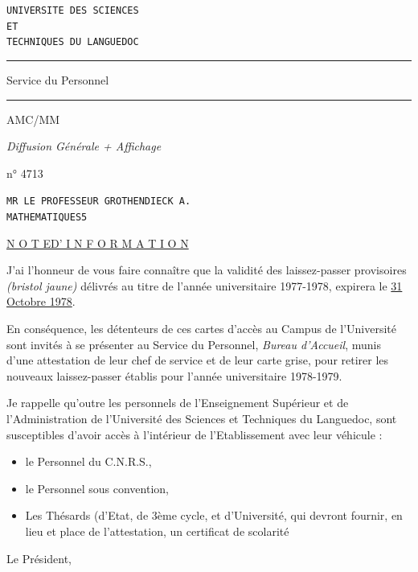 
\begin{flushleft}
\texttt{UNIVERSITE DES SCIENCES}\\
\texttt{ET}\\
\texttt{TECHNIQUES DU LANGUEDOC}

\rule{3cm}{.3pt}

Service du Personnel

\rule{1cm}{.3pt}

AMC/MM

\textit{Diffusion Générale + Affichage}

n° 4713
\end{flushleft}

\begin{flushright}
\texttt{MR LE PROFESSEUR GROTHENDIECK A.}\\
\texttt{MATHEMATIQUES}\qquad\texttt{5}
\end{flushright}

\begin{center}
\uline{N O T E\qquad D' I N F O R M A T I O N}
\end{center}

J'ai l'honneur de vous faire connaître que la validité des laissez-passer provisoires \textit{(bristol jaune)} délivrés au titre de l'année universitaire 1977-1978, expirera le \uline{31 Octobre 1978}.

En conséquence, les détenteurs de ces cartes d'accès au Campus de l'Université sont invités à se présenter au Service du Personnel, \textit{Bureau d'Accueil}, munis d'une attestation de leur chef de service et de leur carte grise, pour retirer les nouveaux laissez-passer établis pour l'année universitaire 1978-1979.

Je rappelle qu'outre les personnels de l'Enseignement Supérieur et de l'Administration de l'Université des Sciences et Techniques du Languedoc, sont susceptibles d'avoir accès à l'intérieur de l'Etablissement avec leur véhicule :

\begin{itemize}
\item[-] le Personnel du C.N.R.S.,
\item[-] le Personnel sous convention,
\item[-] Les Thésards (d'Etat, de 3ème cycle, et d'Université, qui devront fournir, en lieu et place de l'attestation, un certificat de scolarité
\end{itemize}

\begin{flushright}
 Le Président,

\end{flushright}

